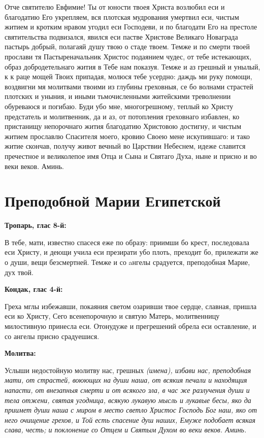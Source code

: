 Отче святителю Евфимие! Ты от юности твоея Христа возлюбил еси и благодатию Его укрепляем, вся плотская мудрования умертвил еси, чистым житием и кротким нравом угодил еси Господеви, и по благодати Его на престоле святительства подвизался, явился еси пастве Христове Великаго Новаграда пастырь добрый, полагаяй душу твою о стаде твоем. Темже и по смерти твоей прослави тя Пастыреначальник Христос подаянием чудес, от тебе истекающих, образ добродетельнаго жития в Тебе нам показуя. Темже и аз грешный и унылый, к к раце мощей Твоих припадая, молюся тебе усердно: даждь ми руку помощи, воздвигни мя молитвами твоими из глубины греховныя, се бо волнами страстей плотских и уныния, и иными тьмочисленными житейскими треволнении обуреваюся и погибаю. Буди убо мне, многогрешному, теплый ко Христу предстатель и молитвенник, да и аз, от потопления греховнаго избавлен, ко пристанищу непорочнаго жития благодатию Христовою достигну, и чистым житием прославлю Спасителя моего, кровию Своею мене искупившаго: и тако житие скончав, получу живот вечный во Царствии Небеснем, идеже славится пречестное и великолепое имя Отца и Сына и Святаго Духа, ныне и присно и во веки веков. Аминь. 


\section{Преподобной Марии  Египетской}
 


\bfseries Тропарь, глас 8-й:\normalfont{}


В тебе, мати, известно спасеся еже по образу: приимши бо крест, последовала еси Христу, и деющи учила еси презирати убо плоть, преходит бо, прилежати же о души, вещи безсмертней. Темже и со aнгелы срадуется, преподобная Марие, дух твой.


\medskip


\bfseries Кондак, глас 4-й:\normalfont{}


Греха мглы избежавши, покаяния светом озаривши твое сердце, славная, пришла еси ко Христу, Сего всенепорочную и святую Матерь, молитвенницу милостивную принесла еси. Отонудуже и прегрешений обрела еси оставление, и со ангелы присно срадуешися.


\medskip


\bfseries Молитва:\normalfont{}


Услыши недостойную молитву нас, грешных \itshape (имена),\normalfont{} избави нас, преподобная мати, от страстей, воюющих на души наша, от всякия печали и находящия напасти, от внезапныя смерти и от всякого зла, в час же разлучения души и тела отжени, святая угодница, всякую лукавую мысль и лукавые бесы, яко да приимет души наша с миром в место светло Христос Господь Бог наш, яко от него очищение грехов, и Той есть спасение душ наших, Емуже подобает всякая слава, честь; и поклонение со Отцем и Святым Духом во веки веков. Аминь.


